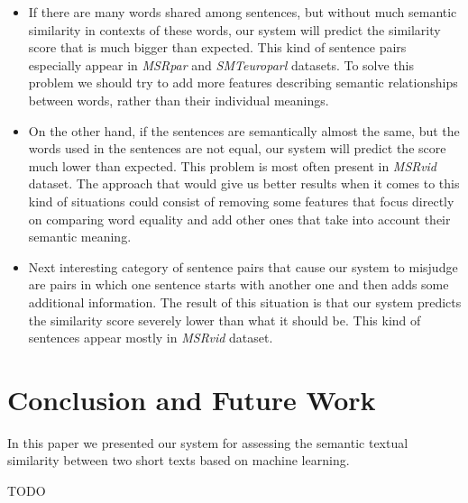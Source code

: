 \documentclass[10pt, a4paper]{article}
\begin{document}
\begin{itemize} \itemsep1pt \parskip0pt 
	\item If there are many words shared among sentences, but without much semantic similarity in contexts of these words, our system will predict the similarity score that is much bigger than expected. This kind of sentence pairs especially appear in \textit{MSRpar} and \textit{SMTeuroparl} datasets. To solve this problem we should try to add more features describing semantic relationships between words, rather than their individual meanings.
	
	\item On the other hand, if the sentences are semantically almost the same, but the words used in the sentences are not equal, our system will predict the score much lower than expected. This problem is most often present in \textit{MSRvid} dataset. The approach that would give us better results when it comes to this kind of situations could consist of removing some features that focus directly on comparing word equality and add other ones that take into account their semantic meaning.
	
	\item Next interesting category of sentence pairs that cause our system to misjudge are pairs in which one sentence starts with another one and then adds some additional information. The result of this situation is that our system predicts the similarity score  severely lower than what it should be. This kind of sentences appear mostly in \textit{MSRvid} dataset.
\end{itemize}

\section{Conclusion and Future Work}

In this paper we presented our system for assessing the semantic textual similarity between two short texts based on machine learning. 

TODO

\nocite{*}

 
\end{document}

